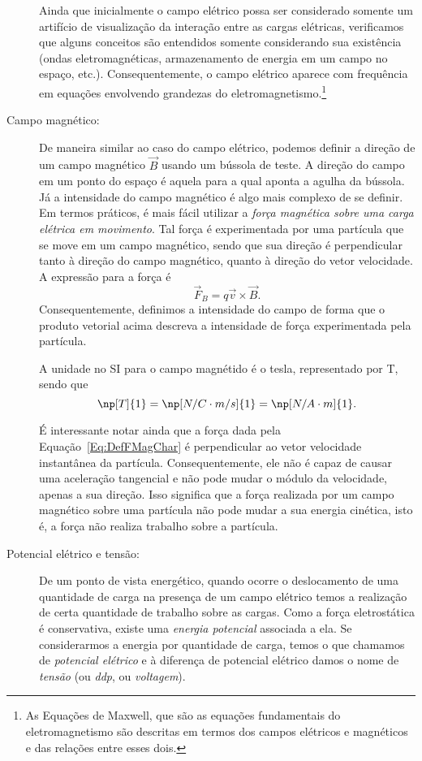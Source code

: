 \begin{description}
    Ainda que inicialmente o campo elétrico possa ser considerado somente um artifício de visualização da interação entre as cargas elétricas, verificamos que alguns conceitos são entendidos somente considerando sua existência (ondas eletromagnéticas, armazenamento de energia em um campo no espaço, etc.). Consequentemente, o campo elétrico aparece com frequência em equações envolvendo grandezas do eletromagnetismo.\footnote{As Equações de Maxwell, que são as equações fundamentais do eletromagnetismo são descritas em termos dos campos elétricos e magnéticos e das relações entre esses dois.}
    
    \item[Campo magnético:] De maneira similar ao caso do campo elétrico, podemos definir a direção de um campo magnético $\vec{B}$ usando um bússola de teste. A direção do campo em um ponto do espaço é aquela para a qual aponta a agulha da bússola. Já a intensidade do campo magnético é algo mais complexo de se definir. Em termos práticos, é mais fácil utilizar a \emph{força magnética sobre uma carga elétrica em movimento}. Tal força é experimentada por uma partícula que se move em um campo magnético, sendo que sua direção é perpendicular tanto à direção do campo magnético, quanto à direção do vetor velocidade. A expressão para a força é
    \begin{equation}\label{Eq:DefFMagChar}
        \vec{F}_B = q \vec{v}\times\vec{B}.
    \end{equation}
    Consequentemente, definimos a intensidade do campo de forma que o produto vetorial acima descreva a intensidade de força experimentada pela partícula.
    
    A unidade no SI para o campo magnétido é o tesla, representado por T, sendo que
    \begin{equation}
        \np[T]{1} = \np[N/C\cdot m/s]{1} = \np[N/A\cdot m]{1}.
    \end{equation}
    
    É interessante notar ainda que a força dada pela Equação~\ref{Eq:DefFMagChar} é perpendicular ao vetor velocidade instantânea da partícula. Consequentemente, ele não é capaz de causar uma aceleração tangencial e não pode mudar o módulo da velocidade, apenas a sua direção. Isso significa que a força realizada por um campo magnético sobre uma partícula não pode mudar a sua energia cinética, isto é, a força não realiza trabalho sobre a partícula.
    
    \item[Potencial elétrico e tensão:] De um ponto de vista energético, quando ocorre o deslocamento de uma quantidade de carga na presença de um campo elétrico temos a realização de certa quantidade de trabalho sobre as cargas. Como a força eletrostática é conservativa, existe uma \emph{energia potencial} associada a ela. Se considerarmos a energia por quantidade de carga, temos o que chamamos de \emph{potencial elétrico} e à diferença de potencial elétrico  damos o nome de \emph{tensão} (ou \emph{ddp}, ou \emph{voltagem}).
    

\end{description}
